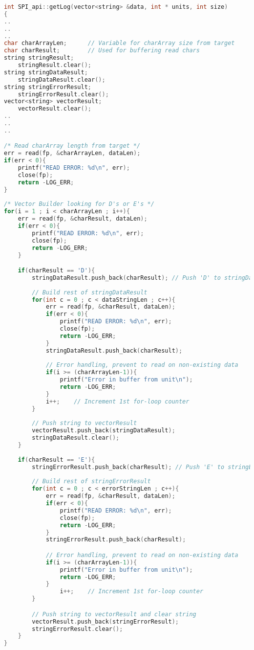 \begin{lstlisting}[language=C]
int SPI_api::getLog(vector<string> &data, int * units, int size)
{
..
..
..
char charArrayLen;		// Variable for charArray size from target
char charResult;		// Used for buffering read chars
string stringResult;
	stringResult.clear();
string stringDataResult;
	stringDataResult.clear();
string stringErrorResult;
	stringErrorResult.clear();
vector<string> vectorResult;
	vectorResult.clear();
..
..
..

/* Read charArray length from target */
err = read(fp, &charArrayLen, dataLen);
if(err < 0){
	printf("READ ERROR: %d\n", err);
	close(fp);
	return -LOG_ERR;
}
	
/* Vector Builder looking for D's or E's */
for(i = 1 ; i < charArrayLen ; i++){
	err = read(fp, &charResult, dataLen);
	if(err < 0){
		printf("READ ERROR: %d\n", err);
		close(fp);
		return -LOG_ERR;
	}

	if(charResult == 'D'){
		stringDataResult.push_back(charResult); // Push 'D' to stringDataResult
		
		// Build rest of stringDataResult
		for(int c = 0 ; c < dataStringLen ; c++){
			err = read(fp, &charResult, dataLen);
			if(err < 0){
				printf("READ ERROR: %d\n", err);
				close(fp);
				return -LOG_ERR;
			}			
			stringDataResult.push_back(charResult);
			
			// Error handling, prevent to read on non-existing data
			if(i >= (charArrayLen-1)){
				printf("Error in buffer from unit\n");
				return -LOG_ERR;
			}
			i++;	// Increment 1st for-loop counter
		}
		
		// Push string to vectorResult
		vectorResult.push_back(stringDataResult);
		stringDataResult.clear();
	}
	
	if(charResult == 'E'){
		stringErrorResult.push_back(charResult); // Push 'E' to stringErrorResult
		
		// Build rest of stringErrorResult
		for(int c = 0 ; c < errorStringLen ; c++){
			err = read(fp, &charResult, dataLen);
			if(err < 0){
				printf("READ ERROR: %d\n", err);
				close(fp);
				return -LOG_ERR;
			}
			stringErrorResult.push_back(charResult);

			// Error handling, prevent to read on non-existing data
			if(i >= (charArrayLen-1)){
				printf("Error in buffer from unit\n");
				return -LOG_ERR;
			}
				i++;	// Increment 1st for-loop counter
		}

		// Push string to vectorResult and clear string
		vectorResult.push_back(stringErrorResult);
		stringErrorResult.clear();
	}
}
\end{lstlisting}

